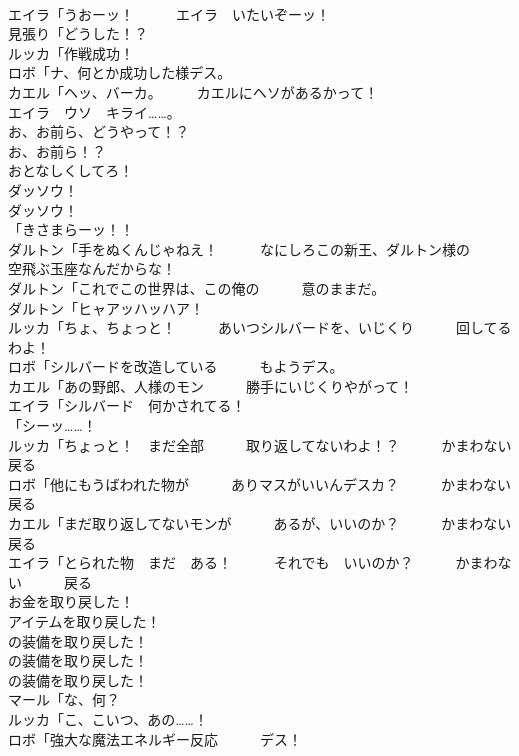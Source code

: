 \documentclass[8pt]{extreport}
\begin{document}
\begin{CJK}{UTF8}{min}
\\	エイラ「うおーッ！　　　エイラ　いたいぞーッ！	
\\	見張り「どうした！？	
\\	ルッカ「作戦成功！	
\\	ロボ「ナ、何とか成功した様デス。	
\\	カエル「ヘッ、バーカ。　　　カエルにヘソがあるかって！	
\\	エイラ　ウソ　キライ……。	
\\	お、お前ら、どうやって！？	
\\	お、お前ら！？	
\\	おとなしくしてろ！	
\\	ダッソウ！
\\	ダッソウ！	
\\	「きさまらーッ！！	
\\	ダルトン「手をぬくんじゃねえ！　　　なにしろこの新王、ダルトン様の　　　空飛ぶ玉座なんだからな！	
\\	ダルトン「これでこの世界は、この俺の　　　意のままだ。	
\\	ダルトン「ヒャアッハッハア！	
\\	ルッカ「ちょ、ちょっと！　　　あいつシルバードを、いじくり　　　回してるわよ！	
\\	ロボ「シルバードを改造している　　　もようデス。	
\\	カエル「あの野郎、人様のモン　　　勝手にいじくりやがって！	
\\	エイラ「シルバード　何かされてる！	
\\	「シーッ……！	
\\	ルッカ「ちょっと！　まだ全部　　　取り返してないわよ！？　　　かまわない　　　戻る	
\\	ロボ「他にもうばわれた物が　　　ありマスがいいんデスカ？　　　かまわない　　　戻る	
\\	カエル「まだ取り返してないモンが　　　あるが、いいのか？　　　かまわない　　　戻る	
\\	エイラ「とられた物　まだ　ある！　　　それでも　いいのか？　　　かまわない　　　戻る	
\\	お金を取り戻した！	
\\	アイテムを取り戻した！	
\\	の装備を取り戻した！	
\\	の装備を取り戻した！	
\\	の装備を取り戻した！	
\\	マール「な、何？	
\\	ルッカ「こ、こいつ、あの……！	
\\	ロボ「強大な魔法エネルギー反応　　　デス！	

\end{CJK}
\end{document}
